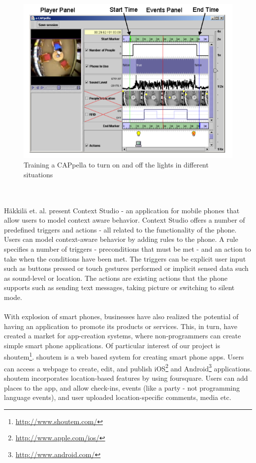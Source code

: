 \begin{figure}
	\centering
	\includegraphics[scale=0.4]{fig/acappella}
	\caption{Training a CAPpella \cite{Dey:2004:CPD:985692.985697} to turn on and off the lights in different situations}
	\label{fig:acappella}
\end{figure}
\\\\
\noindent Häkkilä et. al. present Context Studio - an application for mobile phones that allow users to model context aware behavior. Context Studio offers a number of predefined triggers and actions - all related to the functionality of the phone. Users can model context-aware behavior by adding rules to the phone. A rule specifies a number of triggers - preconditions that must be met - and an action to take when the conditions have been met. The triggers can be explicit user input such as buttons pressed or touch gestures performed or implicit sensed data such as sound-level or location. The actions are existing actions that the phone supports such as sending text messages, taking picture or switching to silent mode.
\\\\ 
With explosion of smart phones, businesses have also realized the potential of having an application to promote its products or services. This, in turn, have created a market for app-creation systems, where non-programmers can create simple smart phone applications. Of particular interest of our project is shoutem\footnote{\url{http://www.shoutem.com/}}. shoutem is a web based system for creating smart phone apps. Users can access a webpage to create, edit, and publish iOS\footnote{\url{http://www.apple.com/ios/}} and Android\footnote{\url{http://www.android.com/}} applications. shoutem incorporates location-based features by using foursquare. Users can add places to the app, and allow check-ins, events (like a party - not programming language events), and user uploaded location-specific comments, media etc. 
